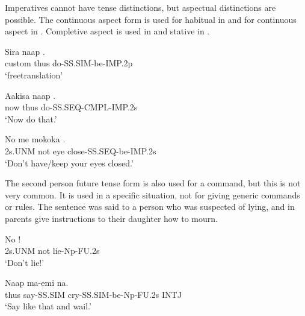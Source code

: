 Imperatives cannot have tense distinctions, but aspectual distinctions are possible. The continuous aspect form is used for habitual in  and for continuous aspect in . Completive aspect is used in  and stative in .

\ea%
\label{ex:x1896}
\gll Sira naap . \\
custom thus do-SS.SIM-be-IMP.2p      \\
\glt `freetranslation'
\z





\ea%
\label{ex:x1161}
\gll Aakisa  naap  . \\
now  thus  do-SS.SEQ-CMPL-IMP.2s      \\
\glt `Now do that.'
\z





\ea%
\label{ex:x1162}
\gll No  me  mokoka  . \\
2s.UNM  not  eye  close-SS.SEQ-be-IMP.2s      \\
\glt `Don't have/keep your eyes closed.'
\z





The second person future tense form is also used for a command, but this is not very common. It is used in a specific situation, not for giving generic commands or rules. The sentence  was said to a person who was suspected of lying, and in  parents give instructions to their daughter how to mourn.

\ea%
\label{ex:x1080}
\gll No    ! \\
 2s.UNM  not  lie-Np-FU.2s     \\
\glt `Don't lie!'
\z





\ea%
\label{ex:x1081}
\gll Naap  ma-emi    na. \\
thus  say-SS.SIM  cry-SS.SIM-be-Np-FU.2s  INTJ      \\
\glt `Say like that and wail.'
\z






